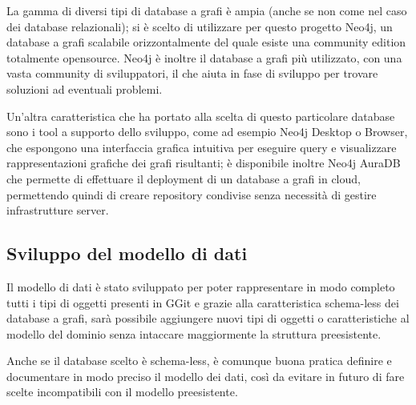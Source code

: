 La gamma di diversi tipi di database a grafi è ampia (anche se non come nel caso dei database relazionali); si è scelto di utilizzare per questo progetto Neo4j, un database a grafi scalabile orizzontalmente del quale esiste una community edition totalmente opensource\cite{neo4jgit}. Neo4j è inoltre il database a grafi più utilizzato\cite{db-engines_2022}, con una vasta community di sviluppatori, il che aiuta in fase di sviluppo per trovare soluzioni ad eventuali problemi.

Un'altra caratteristica che ha portato alla scelta di questo particolare database sono i tool a supporto dello sviluppo, come ad esempio Neo4j Desktop o Browser, che espongono una interfaccia grafica intuitiva per eseguire query e visualizzare rappresentazioni grafiche dei grafi risultanti; è disponibile inoltre Neo4j AuraDB che permette di effettuare il deployment di un database a grafi in cloud, permettendo quindi di creare repository condivise senza necessità di gestire infrastrutture server.

\subsection{Sviluppo del modello di dati}
\label{sec:datamodel}
Il modello di dati è stato sviluppato per poter rappresentare in modo completo tutti i tipi di oggetti presenti in GGit e grazie alla caratteristica schema-less dei database a grafi, sarà possibile aggiungere nuovi tipi di oggetti o caratteristiche al modello del dominio senza intaccare maggiormente la struttura preesistente.

Anche se il database scelto è schema-less, è comunque buona pratica definire e documentare in modo preciso il modello dei dati, così da evitare in futuro di fare scelte incompatibili con il modello preesistente.

